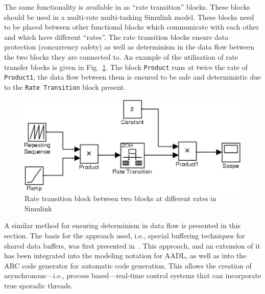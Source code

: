 The same functionality is available in \simu as ``rate transition''
blocks. These blocks should be used in a multi-rate multi-tasking
Simulink model. These blocks need to be placed between other
functional blocks which communicate with each other and which have
different ``rates''. The rate transition blocks ensure data protection
(concurrency safety) as well as determinism in the data flow between
the two blocks they are connected to. An example of the utilisation of
rate transfer blocks is given in Fig.~\ref{fig:rate_transition}. The
block \texttt{Product} runs at twice the rate of \texttt{Product1},
the data flow between them is ensured to be safe and deterministic due
to the \texttt{Rate Transition} block present.

\begin{figure}
\centering
\includegraphics[scale=0.8]{figs/rate_transition}
\caption{Rate transition block between two blocks at different rates
  in Simulink}
\label{fig:rate_transition}
\end{figure}

A similar method for ensuring determinism in data flow is presented in
this section. The basis for the approach used, i.e., special buffering
techniques for shared data buffers, was first presented
in~\cite{tripakis@emsoft05}. This approach, and an extension of it has
been integrated into the modeling notation for AADL, as well as into
the ARC code generator for automatic code generation. This allows the
creation of asynchronous---i.e., process based---real-time control
systems that can incorporate true sporadic threads.

